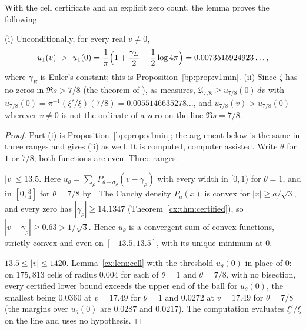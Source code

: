 With the cell certificate and an explicit zero count, the lemma proves the following.

\begin{theorem}\label{cx:thm:globalmin}
(i) Unconditionally, for every real $v\ne0$,
\[
u_1(v)\ >\ u_1(0)=\frac1\pi\Bigl(1+\frac{\gamma_E}2-\frac12\log4\pi\Bigr)=0.0073515924923\ldots,
\]
where $\gamma_E$ is Euler's constant; this is Proposition~\ref{bp:prop:v1min}.
(ii) Since $\zeta$ has no zeros in $\Re s>7/8$ (the theorem of \cite{OAI26a}), as measures, $\mathfrak U_{7/8}\ge u_{7/8}(0)\,dv$ with $u_{7/8}(0)=\pi^{-1}(\xi'/\xi)(7/8)=0.0055146635278\ldots$, and $u_{7/8}(v)>u_{7/8}(0)$ wherever $v\ne0$ is not the ordinate of a zero on the line $\Re s=7/8$.
\end{theorem}

\begin{proof}
Part (i) is Proposition~\ref{bp:prop:v1min}; the argument below is the same in three ranges and gives (ii) as well. It is computed, computer assisted. Write $\theta$ for $1$ or $7/8$; both functions are even. Three ranges.

$|v|\le13.5$. Here $u_\theta=\sum_\rho P_{\theta-\sigma_\rho}(v-\gamma_\rho)$ with every width in $[0,1)$ for $\theta=1$, and in $[0,\tfrac34]$ for $\theta=7/8$ by \cite{OAI26a}. The Cauchy density $P_a(x)$ is convex for $|x|\ge a/\sqrt3$, and every zero has $|\gamma_\rho|\ge14.1347$ (Theorem~\ref{cx:thm:certified}), so $|v-\gamma_\rho|\ge0.63>1/\sqrt3$. Hence $u_\theta$ is a convergent sum of convex functions, strictly convex and even on $[-13.5,13.5]$, with its unique minimum at $0$.

$13.5\le|v|\le1420$. Lemma~\ref{cx:lem:cell} with the threshold $u_\theta(0)$ in place of $0$: on $175{,}813$ cells of radius $0.004$ for each of $\theta=1$ and $\theta=7/8$, with no bisection, every certified lower bound exceeds the upper end of the ball for $u_\theta(0)$, the smallest being $0.0360$ at $v=17.49$ for $\theta=1$ and $0.0272$ at $v=17.49$ for $\theta=7/8$ (the margins over $u_\theta(0)$ are $0.0287$ and $0.0217$). The computation evaluates $\xi'/\xi$ on the line and uses no hypothesis.


\end{proof}
